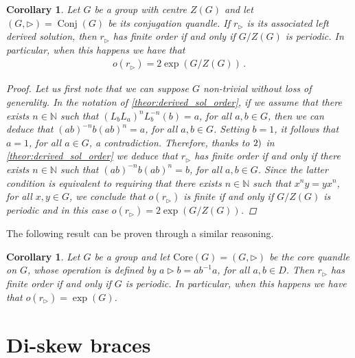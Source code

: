\documentclass[preprint,1p]{elsarticle}
\numberwithin{equation}{section}
\newtheorem{cor}[theor]{Corollary}
\theoremstyle{definition}               %
\newcommand{\tr}{\triangleright}
\DeclareMathOperator{\Conj}{Conj}
\begin{document}
\begin{cor}\label{corol:conj_sol_order}
    Let $G$ be a group with centre $Z(G)$ and let $(G,\tr) = \Conj(G)$ be its conjugation quandle.
    If $r_\tr$ is its associated left derived solution, then $r_\tr$ has finite order if and only if $G/Z(G)$ is periodic.
    In particular, when this happens we have that
    \begin{align*}
        o(r_\tr) = 2\exp(G/Z(G)) \,.
    \end{align*}
    \begin{proof}
        Let us first note that we can suppose $G$ non-trivial without loss of generality.
        In the notation of \cref{theor:derived_sol_order}, if we assume that there exists $n \in \mathbb{N}$ such that $(L_bL_a)^nL_b^{-n}(b) = a$, for all $a,b \in G$, then we can deduce that $(ab)^{-n} b (ab)^n = a$, for all $a,b \in G$.
        Setting $b = 1$, it follows that $a = 1$, for all $a \in G$, a contradiction.
        Therefore, thanks to $\textnormal{2})$ in \cref{theor:derived_sol_order} we deduce that $r_\tr$ has finite order if and only if there exists $n \in \mathbb{N}$ such that $(ab)^{-n} b (ab)^n = b$, for all $a,b \in G$.
        Since the latter condition is equivalent to requiring that there exists $n \in \mathbb{N}$ such that $x^n y = y x^n$, for all $x,y \in G$, we conclude that $o(r_\tr)$ is finite if and only if $G/Z(G)$ is periodic and in this case $o(r_\tr) = 2\exp(G/Z(G))$.
    \end{proof}
\end{cor}

The following result can be proven through a similar reasoning.

\begin{cor}
    Let $G$ be a group and let $\text{Core}(G) = (G,\tr)$ be the core quandle on $G$, whose operation is defined by $a \tr b = a b^{-1} a$, for all $a,b \in D$.
    Then $r_\tr$ has finite order if and only if $G$ is periodic.
    In particular, when this happens we have that $o(r_\tr) = \exp(G)$.
\end{cor}

\smallskip

\section{Di-skew braces}\label{Sec2}         
\end{document}
